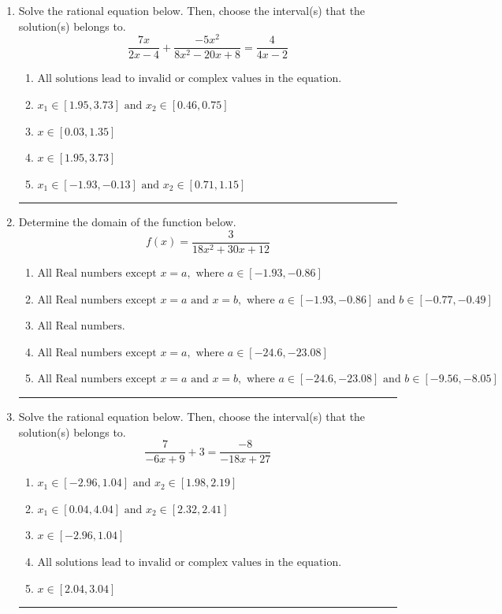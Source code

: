 \documentclass[14pt]{extbook}
\newcommand{\litem}[1]{\item#1\hspace*{-1cm}\rule{\textwidth}{0.4pt}}
\begin{document}
\begin{enumerate}
{\begin{enumerate}[label=\Alph*.]
\end{enumerate} }
\litem{
Solve the rational equation below. Then, choose the interval(s) that the solution(s) belongs to.\[ \frac{7x}{2x -4} + \frac{-5x^{2}}{8x^{2} -20 x + 8} = \frac{4}{4x -2} \]\begin{enumerate}[label=\Alph*.]
\item \( \text{All solutions lead to invalid or complex values in the equation.} \)
\item \( x_1 \in [1.95, 3.73] \text{ and } x_2 \in [0.46,0.75] \)
\item \( x \in [0.03,1.35] \)
\item \( x \in [1.95,3.73] \)
\item \( x_1 \in [-1.93, -0.13] \text{ and } x_2 \in [0.71,1.15] \)

\end{enumerate} }
\litem{
Determine the domain of the function below.\[ f(x) = \frac{3}{18x^{2} +30 x + 12} \]\begin{enumerate}[label=\Alph*.]
\item \( \text{All Real numbers except } x = a, \text{ where } a \in [-1.93, -0.86] \)
\item \( \text{All Real numbers except } x = a \text{ and } x = b, \text{ where } a \in [-1.93, -0.86] \text{ and } b \in [-0.77, -0.49] \)
\item \( \text{All Real numbers.} \)
\item \( \text{All Real numbers except } x = a, \text{ where } a \in [-24.6, -23.08] \)
\item \( \text{All Real numbers except } x = a \text{ and } x = b, \text{ where } a \in [-24.6, -23.08] \text{ and } b \in [-9.56, -8.05] \)

\end{enumerate} }
\litem{
Solve the rational equation below. Then, choose the interval(s) that the solution(s) belongs to.\[ \frac{7}{-6x + 9} + 3 = \frac{-8}{-18x + 27} \]\begin{enumerate}[label=\Alph*.]
\item \( x_1 \in [-2.96, 1.04] \text{ and } x_2 \in [1.98,2.19] \)
\item \( x_1 \in [0.04, 4.04] \text{ and } x_2 \in [2.32,2.41] \)
\item \( x \in [-2.96,1.04] \)
\item \( \text{All solutions lead to invalid or complex values in the equation.} \)
\item \( x \in [2.04,3.04] \)


\end{enumerate}}
\end{enumerate}
\end{document}
